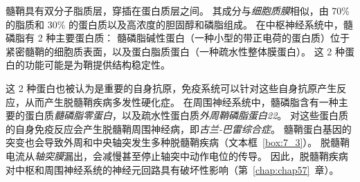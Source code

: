 髓鞘具有双分子脂质层，穿插在蛋白质层之间。
其成分与\textit{细胞质膜}相似，由 70\% 的脂质和 30\% 的蛋白质以及高浓度的胆固醇和磷脂组成。
在中枢神经系统中，髓磷脂有 2 种主要蛋白质：
髓磷脂碱性蛋白（一种小型的带正电荷的蛋白质）位于紧密髓鞘的细胞质表面，以及蛋白脂质蛋白（一种疏水性整体膜蛋白）。
这 2 种蛋白的功能可能是为鞘提供结构稳定性。



这 2 种蛋白也被认为是重要的自身抗原，免疫系统可以针对这些自身抗原产生反应，从而产生脱髓鞘疾病多发性硬化症。
在周围神经系统中，髓磷脂含有一种主要的蛋白质\textit{髓磷脂零蛋白}，以及疏水性蛋白质\textit{外周鞘磷脂蛋白22}。
对这些蛋白质的自身免疫反应会产生脱髓鞘周围神经病，即\textit{古兰-巴雷综合症}。
髓鞘蛋白基因的突变也会导致外周和中央轴突发生多种脱髓鞘疾病（文本框~\ref{box:7_3}）。
脱髓鞘电流从\textit{轴突膜}漏出，会减慢甚至停止轴突中动作电位的传导。
因此，脱髓鞘疾病对中枢和周围神经系统的神经元回路具有破坏性影响（第~\ref{chap:chap57}~章）。


